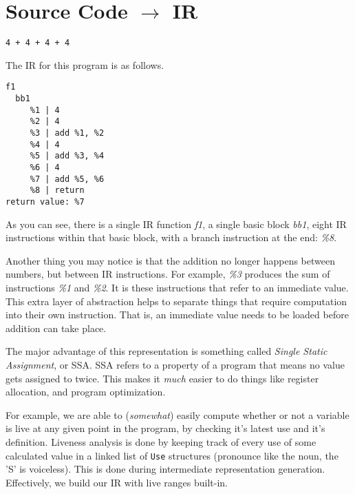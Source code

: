\documentclass[
12pt,
letterpaper,
oneside,
]{memoir}
\begin{document}
\section{Source Code $\rightarrow$ IR}

\begin{verbatim}
4 + 4 + 4 + 4
\end{verbatim}

\filbreak
\noindent

The IR for this program is as follows.

\begin{verbatim}
f1
  bb1
     %1 | 4
     %2 | 4
     %3 | add %1, %2
     %4 | 4
     %5 | add %3, %4
     %6 | 4
     %7 | add %5, %6
     %8 | return
return value: %7
\end{verbatim}

As you can see, there is a single IR function \emph{f1}, a single basic block \emph{bb1}, eight IR instructions within that basic block, with a branch instruction at the end: \emph{\%8}.

Another thing you may notice is that the addition no longer happens between numbers, but between IR instructions. For example, \emph{\%3} produces the sum of instructions \emph{\%1} and \emph{\%2}. It is these instructions that refer to an immediate value. This extra layer of abstraction helps to separate things that require computation into their own instruction. That is, an immediate value needs to be loaded before addition can take place.

The major advantage of this representation is something called \emph{Single Static Assignment}, or SSA. SSA refers to a property of a program that means no value gets assigned to twice. This makes it \emph{much} easier to do things like register allocation, and program optimization.

\filbreak

For example, we are able to ({\footnotesize \emph{somewhat}}) easily compute whether or not a variable is live at any given point in the program, by checking it's latest use and it's definition. Liveness analysis is done by keeping track of every use of some calculated value in a linked list of \verb|Use| structures (pronounce like the noun, the 'S' is voiceless). This is done during intermediate representation generation. Effectively, we build our IR with live ranges built-in.
\end{document}
